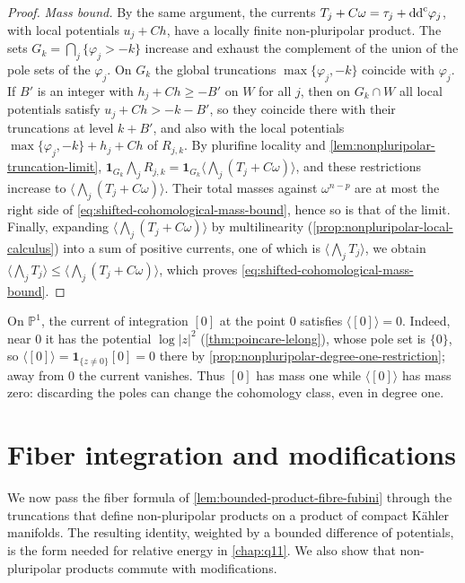 \begin{proof}
\emph{Mass bound.} By the same argument, the currents $T_j+C\omega=\tau_j+\mathrm{dd}^{\mathrm{c}}\varphi_j$, with local potentials $u_j+Ch$, have a locally finite non-pluripolar product. The sets $G_k=\bigcap_j\{\varphi_j>-k\}$ increase and exhaust the complement of the union of the pole sets of the $\varphi_j$. On $G_k$ the global truncations $\max\{\varphi_j,-k\}$ coincide with $\varphi_j$. If $B'$ is an integer with $h_j+Ch\geq-B'$ on $W$ for all $j$, then on $G_k\cap W$ all local potentials satisfy $u_j+Ch>-k-B'$, so they coincide there with their truncations at level $k+B'$, and also with the local potentials $\max\{\varphi_j,-k\}+h_j+Ch$ of $R_{j,k}$. By plurifine locality and \cref{lem:nonpluripolar-truncation-limit}, $\mathbf1_{G_k}\bigwedge_jR_{j,k}=\mathbf1_{G_k}\langle\bigwedge_j(T_j+C\omega)\rangle$, and these restrictions increase to $\langle\bigwedge_j(T_j+C\omega)\rangle$. Their total masses against $\omega^{n-p}$ are at most the right side of \eqref{eq:shifted-cohomological-mass-bound}, hence so is that of the limit. Finally, expanding $\langle\bigwedge_j(T_j+C\omega)\rangle$ by multilinearity (\cref{prop:nonpluripolar-local-calculus}) into a sum of positive currents, one of which is $\langle\bigwedge_jT_j\rangle$, we obtain $\langle\bigwedge_j T_j\rangle\leq\langle\bigwedge_j(T_j+C\omega)\rangle$, which proves \eqref{eq:shifted-cohomological-mass-bound}.
\end{proof}

\begin{example}\label{ex:nonpluripolar-divisor-zero-mass}
On $\mathbb P^1$, the current of integration $[0]$ at the point $0$ satisfies $\langle[0]\rangle=0$. Indeed, near $0$ it has the potential $\log|z|^2$ (\cref{thm:poincare-lelong}), whose pole set is $\{0\}$, so $\langle[0]\rangle=\mathbf1_{\{z\neq0\}}[0]=0$ there by \cref{prop:nonpluripolar-degree-one-restriction}; away from $0$ the current vanishes. Thus $[0]$ has mass one while $\langle[0]\rangle$ has mass zero: discarding the poles can change the cohomology class, even in degree one.
\end{example}



\section{Fiber integration and modifications}
\label{sec:nonpluripolar-fibres}
We now pass the fiber formula of \cref{lem:bounded-product-fibre-fubini} through the truncations that define non-pluripolar products on a product of compact K\"ahler manifolds. The resulting identity, weighted by a bounded difference of potentials, is the form needed for relative energy in \cref{chap:q11}. We also show that non-pluripolar products commute with modifications.

